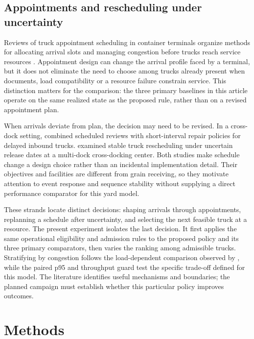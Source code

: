 \documentclass[12pt,a4paper]{article}
\begin{document}
\subsection{Appointments and rescheduling under uncertainty}

Reviews of truck appointment scheduling in container terminals organize methods for allocating arrival slots and managing congestion before trucks reach service resources \parencite{abdelmagidComprehensiveReviewTruck2022a,graciaTruckAppointmentScheduling2025a}. Appointment design can change the arrival profile faced by a terminal, but it does not eliminate the need to choose among trucks already present when documents, load compatibility or a resource failure constrain service. This distinction matters for the comparison: the three primary baselines in this article operate on the same realized state as the proposed rule, rather than on a revised appointment plan.

When arrivals deviate from plan, the decision may need to be revised. In a cross-dock setting, \textcite{nasiriPredictivereactiveCrossdockRescheduling2022} combined scheduled reviews with short-interval repair policies for delayed inbound trucks. \textcite{fonsecaStabilityApproachCDC2025} examined stable truck rescheduling under uncertain release dates at a multi-dock cross-docking center. Both studies make schedule change a design choice rather than an incidental implementation detail. Their objectives and facilities are different from grain receiving, so they motivate attention to event response and sequence stability without supplying a direct performance comparator for this yard model.

These strands locate distinct decisions: shaping arrivals through appointments, replanning a schedule after uncertainty, and selecting the next feasible truck at a resource. The present experiment isolates the last decision. It first applies the same operational eligibility and admission rules to the proposed policy and its three primary comparators, then varies the ranking among admissible trucks. Stratifying by congestion follows the load-dependent comparison observed by \textcite{r.berrutoAnalyzingReceivingOperation2001a}, while the paired p95 and throughput guard test the specific trade-off defined for this model. The literature identifies useful mechanisms and boundaries; the planned campaign must establish whether this particular policy improves outcomes.

\section{Methods}
\end{document}

